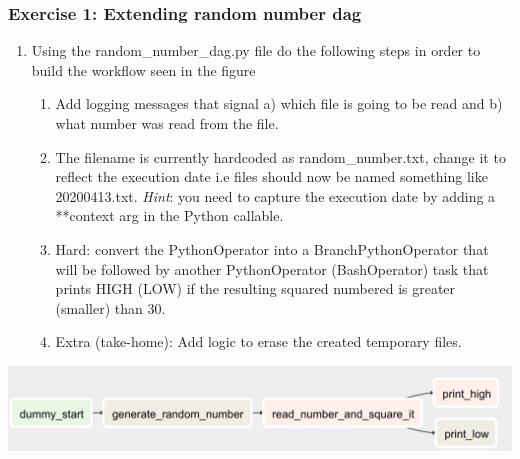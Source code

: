 \documentclass[leqno, 10pt, envcountsect]{beamer}
\numberwithin{equation}{section}
\theoremstyle{definition}
\theoremstyle{example}
\numberwithin{figure}{section}
\numberwithin{table}{section}
\let\olditem\item
\renewcommand{\item}{%
\olditem\vspace{1pt}}
\begin{document}
\begin{frame}[fragile=singleslide]
  \frametitle{Exercise 1: Extending random number dag}
  \begin{enumerate}
    \item Using the random_number_dag.py file do the following steps in order
      to build the workflow seen in the figure
    \begin{enumerate}
      \item Add logging messages that signal a) which file is going to be read and b) what number was read from the file.
      \item The filename is currently hardcoded as random_number.txt, change it
        to reflect the execution date i.e files should now be named something
        like 20200413.txt. \textit{Hint}: you need to capture the execution date by
        adding a **context arg in the Python callable.
      \item Hard: convert the PythonOperator into a BranchPythonOperator that will be followed by another PythonOperator (BashOperator) task that prints HIGH (LOW) if the resulting squared numbered is greater (smaller) than 30.
      \item Extra (take-home): Add logic to erase the created temporary files.
    \end{enumerate}
  \end{enumerate}
  \begin{center}
    \includegraphics[scale=0.1]{exercise_1.png}
  \end{center}
\end{frame}
\end{document}
